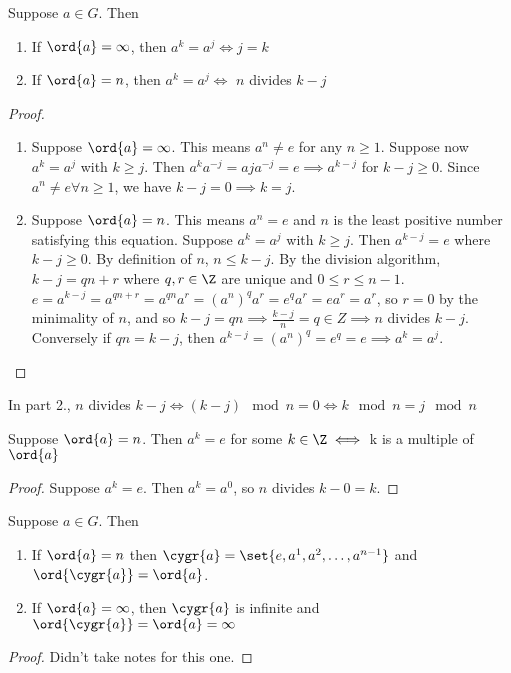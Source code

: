 \begin{theorem}
    Suppose $a \in G$. Then 
    \begin{enumerate}
        \item If $\ord{ a } = \infty$, then $a^k = a^j \iff j = k$
        \item If $\ord{ a } = n$, then $a^k = a^j \iff$ $n$ divides $k - j$
    \end{enumerate}
\end{theorem}
\begin{proof}
    \begin{enumerate}
        \item Suppose $\ord{ a } = \infty$. This means $a^n \neq e$ for any $n \geq 1$. Suppose now $a^k = a^j$ with $k \geq j$. Then $a^ka^{-j} = aja^{-j} = e \implies a^{k-j}$ for $k - j \geq 0$. Since $a^n \neq e \forall n \geq 1$, we have $k - j = 0 \implies k = j$.
        \item Suppose $\ord{ a } = n$. This means $a^n = e$ and $n$ is the least positive number satisfying this equation. Suppose $a^k = a^j$ with $k \geq j$. Then $a^{k-j} = e$ where $k - j \geq 0$. By definition of $n$, $n \leq k - j$. By the division algorithm, $k - j = qn + r$ where $q, r \in \Z$ are unique and $0 \leq r \leq n - 1$. \\
        $e = a^{k - j} = a^{qn + r} = a^{qn} a^r = \left(a^n\right)^q a^r = e^q a^r = ea^r =a^r$, so $r = 0$ by the minimality of $n$, and so $k - j = qn \implies \frac{k-j}{n} = q \in Z \implies n$ divides $k - j$.\\
        Conversely if $qn = k - j$, then $a^{k-j} = \left(a^n\right)^q = e^q = e \implies a^k = a^j$.
    \end{enumerate}
\end{proof}

\begin{remark}
    In part 2., $n$ divides $k-j \iff (k-j) \mod n = 0 \iff k \mod n = j \mod n$
\end{remark}

\begin{corollary}
    Suppose $\ord{ a } = n$. Then $a^k = e$ for some $k \in \Z \iff$ k is a multiple of $\ord{ a }$
\end{corollary}
\begin{proof}
    Suppose $a^k = e$. Then $a^k = a^0$, so $n$ divides $k - 0 = k$.
\end{proof}

\begin{corollary}
    Suppose $a \in G$. Then \begin{enumerate}
        \item If $\ord{a} = n$ then $\cygr{a} = \set{e, a^1, a^2, \dots, a^{n-1}}$ and $\ord{\cygr{a}} = \ord{a}$.
        \item If $\ord{a} = \infty$, then $\cygr{a}$ is infinite and $\ord{\cygr{a}} = \ord{a} = \infty$
    \end{enumerate}
\end{corollary}
\begin{proof}
    Didn't take notes for this one.
\end{proof}

